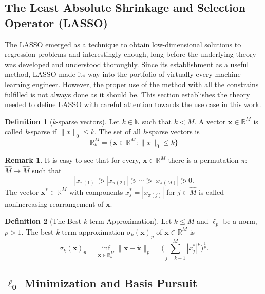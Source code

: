 \documentclass[11pt,american]{book} %
\theoremstyle{plain}
\theoremstyle{definition}
\newtheorem{defn}{Definition}
\newtheorem{rmrk}{Remark}
\begin{document}
\subsection{The Least Absolute Shrinkage and Selection Operator (LASSO)}
The LASSO emerged as a technique to obtain low-dimensional solutions to regression problems and interestingly enough, long before the underlying theory was developed and understood thoroughly. Since its establishment as a useful method, LASSO made its way into the portfolio of virtually every machine learning engineer. However, the proper use of the method with all the constrains fulfilled is not always done as it should be. This section establishes the theory needed to define LASSO with careful attention towards the use case in this work.
\begin{defn}[\emph{k}-sparse vectors]
	Let $k \in \mathbb{N}$ such that $k<M$. A vector $\bm{x} \in \mathbb{R}^{M}$ is called \emph{k}-sparse if $\lVert x\rVert_{0} \leqslant k$. The set of all \emph{k}-sparse vectors is
	\begin{equation}
		\mathbb{R}_{k}^{M} = \{ \bm{x} \in \mathbb{R}^{M} : \lVert x\rVert_{0} \leqslant k\} \label{ksparse}
	\end{equation}
\end{defn}

\begin{rmrk}
	It is easy to see that for every, $\bm{x} \in \mathbb{R}^{M}$ there is a permutation $\pi$: $\hat{M} \mapsto \hat{M}$ such that
	\begin{equation}
		|x_{\pi(1)}|\eqslantgtr |x_{\pi(2)}|\eqslantgtr \cdots \eqslantgtr|x_{\pi(M)}|\eqslantgtr 0.
	\end{equation}
	The vector $\bm{x}^* \in \mathbb{R}^{M}$ with components $x_{j}^*=|x_{\pi(j)}|$ for $j \in \hat{M}$ is called nonincreasing rearrangement of $\bm{x}$.
\end{rmrk}

\begin{defn}[The Best \emph{k}-term Approximation]
	Let $k \leqslant M$ and $\ell_{p}$ be a norm, $p>1$. The best \emph{k}-term approximation $\sigma_k (\bm{x})_p$ of $\bm{x} \in \mathbb{R}^{M}$ is
	\begin{equation}
		\sigma_k (\bm{x})_p = \inf_{\bm{\tilde{x}} \in \mathbb{R}^{M}_k}\lVert \bm{x}-\bm{\tilde{x}}\rVert_{p} = \Big(\sum_{j=k+1}^{M}|{x}^{*}_j|^{p}\Big)^{ \frac{1}{p}}.
	\end{equation}
\end{defn}

\subsection*{$\bm{\ell_{0}}$ Minimization and Basis Pursuit}
\end{document}
